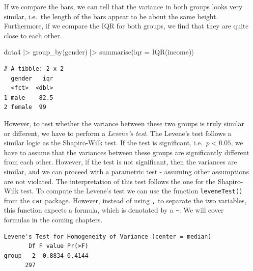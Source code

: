 \documentclass[
  letterpaper,
  DIV=11,
  numbers=noendperiod]{scrreprt}
\newenvironment{Shaded}{\begin{snugshade}}{\end{snugshade}}
\newcommand{\AttributeTok}[1]{\textcolor[rgb]{0.40,0.45,0.13}{#1}}
\newcommand{\FunctionTok}[1]{\textcolor[rgb]{0.28,0.35,0.67}{#1}}
\newcommand{\NormalTok}[1]{\textcolor[rgb]{0.00,0.23,0.31}{#1}}
\newcommand{\SpecialCharTok}[1]{\textcolor[rgb]{0.37,0.37,0.37}{#1}}
\begin{document}
If we compare the bars, we can tell that the variance in both groups
looks very similar, i.e.~the length of the bars appear to be about the
same height. Furthermore, if we compare the IQR for both groups, we find
that they are quite close to each other.

\begin{Shaded}
\begin{Highlighting}[]
\NormalTok{data4 }\SpecialCharTok{|\textgreater{}}
  \FunctionTok{group\_by}\NormalTok{(gender) }\SpecialCharTok{|\textgreater{}}
  \FunctionTok{summarise}\NormalTok{(}\AttributeTok{iqr =} \FunctionTok{IQR}\NormalTok{(income))}
\end{Highlighting}
\end{Shaded}

\begin{verbatim}
# A tibble: 2 x 2
  gender   iqr
  <fct>  <dbl>
1 male    82.5
2 female  99  
\end{verbatim}

However, to test whether the variance between these two groups is truly
similar or different, we have to perform a \emph{Levene's test}. The
Levene's test follows a similar logic as the Shapiro-Wilk test. If the
test is significant, i.e.~\(p < 0.05\), we have to assume that the
variances between these groups are significantly different from each
other. However, if the test is not significant, then the variances are
similar, and we can proceed with a parametric test - assuming other
assumptions are not violated. The interpretation of this test follows
the one for the Shapiro-Wilk test. To compute the Levene's test we can
use the function \texttt{leveneTest()} from the \texttt{car} package.
However, instead of using \texttt{,} to separate the two variables, this
function expects a formula, which is denotated by a
\texttt{\textasciitilde{}}. We will cover formulas in the coming
chapters.

\begin{Shaded}
\end{Shaded}

\begin{verbatim}
Levene's Test for Homogeneity of Variance (center = median)
       Df F value Pr(>F)
group   2  0.8834 0.4144
      297               
\end{verbatim}
\end{document}
